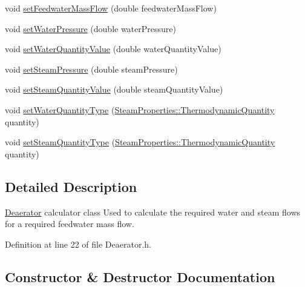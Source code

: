 \begin{DoxyCompactItemize}
\item 
void \hyperlink{class_deaerator_ada95cb2557bc43602d7bcefbad66c853}{set\+Feedwater\+Mass\+Flow} (double feedwater\+Mass\+Flow)
\item 
void \hyperlink{class_deaerator_ae23f64c6983daed388a73c033a15e176}{set\+Water\+Pressure} (double water\+Pressure)
\item 
void \hyperlink{class_deaerator_ac31cf2deb8bf30ee6921d1d9f8281eb8}{set\+Water\+Quantity\+Value} (double water\+Quantity\+Value)
\item 
void \hyperlink{class_deaerator_a5936221e68b5ba3245f0adabed74e6d7}{set\+Steam\+Pressure} (double steam\+Pressure)
\item 
void \hyperlink{class_deaerator_a101399a8b66c3ff1fecf884fd1b1373d}{set\+Steam\+Quantity\+Value} (double steam\+Quantity\+Value)
\item 
void \hyperlink{class_deaerator_ac60ad3d6650ed6c7783d18833bb7e3dd}{set\+Water\+Quantity\+Type} (\hyperlink{class_steam_properties_ae0294bedf7d178c2d8fb6aed0f62fbff}{Steam\+Properties\+::\+Thermodynamic\+Quantity} quantity)
\item 
void \hyperlink{class_deaerator_a1aa3b3de064d148479af9576e717b6c2}{set\+Steam\+Quantity\+Type} (\hyperlink{class_steam_properties_ae0294bedf7d178c2d8fb6aed0f62fbff}{Steam\+Properties\+::\+Thermodynamic\+Quantity} quantity)
\end{DoxyCompactItemize}


\subsection{Detailed Description}
\hyperlink{class_deaerator}{Deaerator} calculator class Used to calculate the required water and steam flows for a required feedwater mass flow. 

Definition at line 22 of file Deaerator.\+h.



\subsection{Constructor \& Destructor Documentation}
\mbox{\label{class_deaerator_a02311c34cbe46384187292e5f844984c}} 
